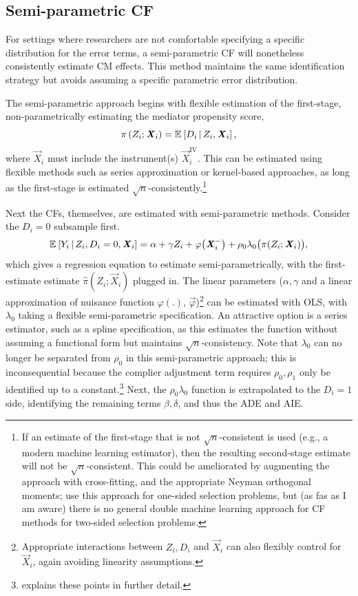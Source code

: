 \subsection{Semi-parametric CF}
For settings where researchers are not comfortable specifying a specific distribution for the error terms, a semi-parametric CF will nonetheless consistently estimate CM effects.
This method maintains the same identification strategy but avoids assuming a specific parametric error distribution.

The semi-parametric approach begins with flexible estimation of the first-stage, non-parametrically estimating the mediator propensity score,
\[ \pi\left(Z_i; \boldsymbol{\mathit{X}}_i \right) = \mathbb{E}_{} \left[ D_i \, \middle\vert \, Z_i, \boldsymbol{\mathit{X}}_i \right], \]
where $\vec X_i$ must include the instrument(s) $\vec X_i^{\text{IV}}$.
This can be estimated using flexible methods such as series approximation or kernel-based approaches, as long as the first-stage is estimated $\sqrt{n}$-consistently.\footnote{
    If an estimate of the first-stage that is not $\sqrt{n}$-consistent is used (e.g., a modern machine learning estimator), then the resulting second-stage estimate will not be $\sqrt{n}$-consistent.
    This could be ameliorated by augmenting the approach with cross-fitting, and the appropriate Neyman orthogonal moments; \cite{bia2024double} use this approach for one-sided selection problems, but (as fas as I am aware) there is no general double machine learning approach for CF methods for two-sided selection problems.  
}

Next the CFs, themselves, are estimated with semi-parametric methods.
Consider the $D_i = 0$ subsample first.
\[ \mathbb{E}_{} \left[ Y_i \, \middle\vert \, Z_i, D_i = 0, \boldsymbol{\mathit{X}}_i \right] =
    \alpha + \gamma Z_i + \varphi\big( \boldsymbol{\mathit{X}}_i^- \big)
    +  \rho_0 \lambda_0 \big( \pi(Z_i ; \boldsymbol{\mathit{X}}_i) \big), \]
which gives a regression equation to estimate semi-parametrically, with the first-estimate estimate $\hat\pi\left(Z_i; \vec X_i \right)$ plugged in.
The linear parameters ($\alpha, \gamma$ and a linear approximation of nuisance function $\varphi(.)$, $\vec \varphi$)\footnote{
    Appropriate interactions between $Z_i, D_i$ and $\vec X_i$ can also flexibly control for $\vec X_i$, again avoiding linearity assumptions.
} can be estimated with OLS, with $\lambda_0$ taking a flexible semi-parametric specification.
An attractive option is a series estimator, such as a spline specification, as this estimates the function without assuming a functional form but maintains $\sqrt n$-consistency.
Note that $\lambda_0$ can no longer be separated from $\rho_0$ in this semi-parametric approach; this is inconsequential because the complier adjustment term requires $\rho_0, \rho_1$ only be identified up to a constant.\footnote{
     explains these points in further detail.
}
Next, the $\rho_0 \lambda_0$ function is extrapolated to the $D_i = 1$ side, identifying the remaining terms $\beta, \delta$, and thus the ADE and AIE.

